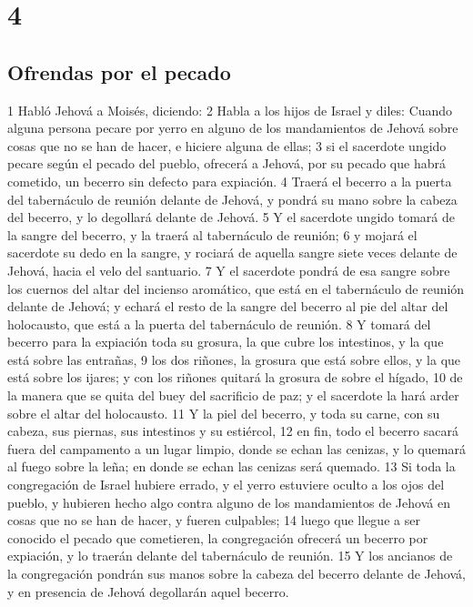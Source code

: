 \chapter{4}

\section*{Ofrendas por el pecado}

1 Habló Jehová a Moisés, diciendo:
2 Habla a los hijos de Israel y diles: Cuando alguna persona pecare por yerro en alguno de los mandamientos de Jehová sobre cosas que no se han de hacer, e hiciere alguna de ellas;
3 si el sacerdote ungido pecare según el pecado del pueblo, ofrecerá a Jehová, por su pecado que habrá cometido, un becerro sin defecto para expiación.
4 Traerá el becerro a la puerta del tabernáculo de reunión delante de Jehová, y pondrá su mano sobre la cabeza del becerro, y lo degollará delante de Jehová.
5 Y el sacerdote ungido tomará de la sangre del becerro, y la traerá al tabernáculo de reunión;
6 y mojará el sacerdote su dedo en la sangre, y rociará de aquella sangre siete veces delante de Jehová, hacia el velo del santuario.
7 Y el sacerdote pondrá de esa sangre sobre los cuernos del altar del incienso aromático, que está en el tabernáculo de reunión delante de Jehová; y echará el resto de la sangre del becerro al pie del altar del holocausto, que está a la puerta del tabernáculo de reunión.
8 Y tomará del becerro para la expiación toda su grosura, la que cubre los intestinos, y la que está sobre las entrañas,
9 los dos riñones, la grosura que está sobre ellos, y la que está sobre los ijares; y con los riñones quitará la grosura de sobre el hígado,
10 de la manera que se quita del buey del sacrificio de paz; y el sacerdote la hará arder sobre el altar del holocausto.
11 Y la piel del becerro, y toda su carne, con su cabeza, sus piernas, sus intestinos y su estiércol,
12 en fin, todo el becerro sacará fuera del campamento a un lugar limpio, donde se echan las cenizas, y lo quemará al fuego sobre la leña; en donde se echan las cenizas será quemado.
13 Si toda la congregación de Israel hubiere errado, y el yerro estuviere oculto a los ojos del pueblo, y hubieren hecho algo contra alguno de los mandamientos de Jehová en cosas que no se han de hacer, y fueren culpables;
14 luego que llegue a ser conocido el pecado que cometieren, la congregación ofrecerá un becerro por expiación, y lo traerán delante del tabernáculo de reunión.
15 Y los ancianos de la congregación pondrán sus manos sobre la cabeza del becerro delante de Jehová, y en presencia de Jehová degollarán aquel becerro.
